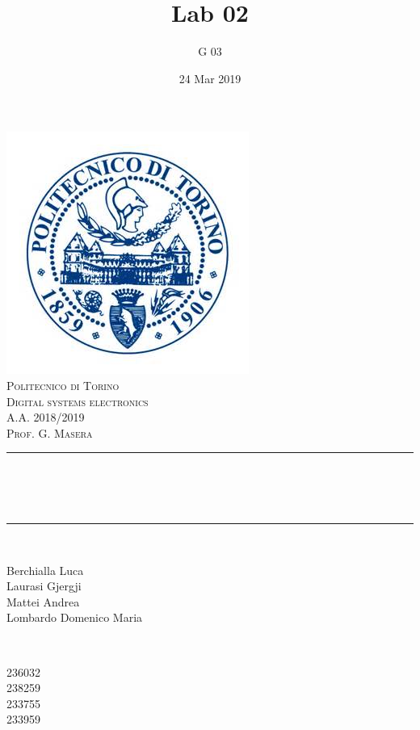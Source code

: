 \documentclass[12pt]{article}
\title{Lab 02}													%
\author{G 03}														%
\date{24 Mar 2019}														%
\makeatletter
\let\thetitle\@title
\let\thedate\@date
\makeatother
\begin{document}

\begin{titlepage}
	\centering
    \vspace*{0.5 cm}
    \includegraphics[scale = 0.75]{polito.jpg}\\[1.0 cm]				%
    \textsc{\LARGE Politecnico di Torino}\\[2.0 cm]						%
	\textsc{\Large Digital systems electronics\\ A.A. 2018/2019}\\[0.5 cm]		%
	\textsc{\Large Prof. G. Masera}\\[0.5 cm]		%
	\rule{\linewidth}{0.2 mm} \\[0.4 cm]
	{ \huge \bfseries \thetitle \\ \small \thedate}\\
	\rule{\linewidth}{0.2 mm} \\[1.5 cm]
	
	\begin{minipage}{0.4\textwidth}
		\begin{flushleft} \large
			Berchialla Luca\\												%
			Laurasi Gjergji
			\\
			
			Mattei Andrea\\
            Lombardo Domenico Maria\\
            
			\end{flushleft}
			\end{minipage}~
			\begin{minipage}{0.4\textwidth}
            
			\begin{flushright} \large
			236032\\													%
			238259\\
            233755\\
            233959\\
            
		\end{flushright}
        
	\end{minipage}\\[2 cm]
	
\end{titlepage}
\end{document}
